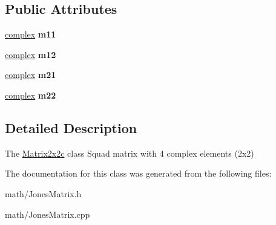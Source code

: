 \subsection*{Public Attributes}
\begin{DoxyCompactItemize}
\item 
\mbox{\label{class_matrix2x2c_af410b74e0a6b338d06a596bdcc2f677e}} 
\mbox{\hyperlink{classcomplex}{complex}} {\bfseries m11}
\item 
\mbox{\label{class_matrix2x2c_a4c14c07761d2cb5175c440c242f9c652}} 
\mbox{\hyperlink{classcomplex}{complex}} {\bfseries m12}
\item 
\mbox{\label{class_matrix2x2c_a37d76148fdb38b45181214d331729cd9}} 
\mbox{\hyperlink{classcomplex}{complex}} {\bfseries m21}
\item 
\mbox{\label{class_matrix2x2c_a350914905c4f7c29ae86f0c299fabc22}} 
\mbox{\hyperlink{classcomplex}{complex}} {\bfseries m22}
\end{DoxyCompactItemize}


\subsection{Detailed Description}
The \mbox{\hyperlink{class_matrix2x2c}{Matrix2x2c}} class Squad matrix with 4 complex elements (2x2) 

The documentation for this class was generated from the following files\+:\begin{DoxyCompactItemize}
\item 
math/Jones\+Matrix.\+h\item 
math/Jones\+Matrix.\+cpp\end{DoxyCompactItemize}
